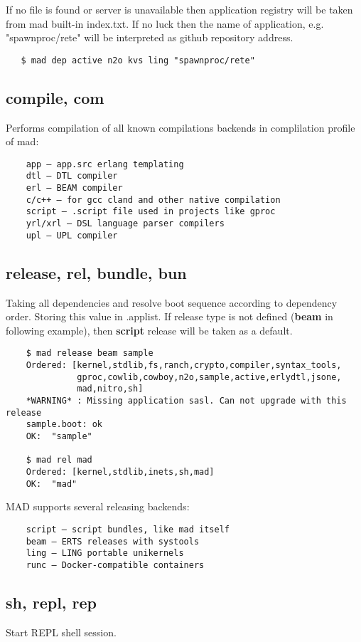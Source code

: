 If no file is found or server is unavailable then application registry will
be taken from mad built-in index.txt. If no luck then the name of application,
e.g. "spawnproc/rete" will be interpreted as github repository address.

\vspace{1\baselineskip}
\begin{lstlisting}
   $ mad dep active n2o kvs ling "spawnproc/rete"
\end{lstlisting}
\vspace{1\baselineskip}

\subsection{compile, com}
Performs compilation of all known compilations backends in complilation profile of mad:
\vspace{1\baselineskip}
\begin{lstlisting}
    app — app.src erlang templating
    dtl — DTL compiler
    erl — BEAM compiler
    c/c++ — for gcc cland and other native compilation
    script — .script file used in projects like gproc
    yrl/xrl — DSL language parser compilers
    upl — UPL compiler
\end{lstlisting}
\vspace{1\baselineskip}

\subsection{release, rel, bundle, bun}
Taking all dependencies and resolve boot sequence according to dependency order.
Storing this value in .applist. If release type is not defined ({\bf beam} in following example),
then {\bf script} release will be taken as a default.
\vspace{1\baselineskip}
\begin{lstlisting}
    $ mad release beam sample
    Ordered: [kernel,stdlib,fs,ranch,crypto,compiler,syntax_tools,
              gproc,cowlib,cowboy,n2o,sample,active,erlydtl,jsone,
              mad,nitro,sh]
    *WARNING* : Missing application sasl. Can not upgrade with this release
    sample.boot: ok
    OK:  "sample"

    $ mad rel mad
    Ordered: [kernel,stdlib,inets,sh,mad]
    OK:  "mad"
\end{lstlisting}
\vspace{1\baselineskip}

MAD supports several releasing backends:

\vspace{1\baselineskip}
\begin{lstlisting}
    script — script bundles, like mad itself
    beam — ERTS releases with systools
    ling — LING portable unikernels
    runc — Docker-compatible containers
\end{lstlisting}
\vspace{1\baselineskip}

\subsection{sh, repl, rep}

Start REPL shell session.
